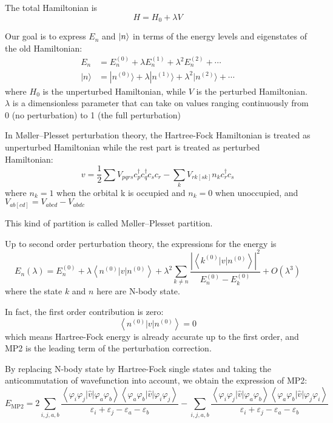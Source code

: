 The total Hamiltonian is
$$
H=H_{0}+\lambda V
$$

Our goal is to express $E_n$ and $\ket{n}$  in terms of the energy levels and eigenstates of the old Hamiltonian:
$$
\begin{aligned}
	E_{n}&=E_{n}^{(0)}+\lambda E_{n}^{(1)}+\lambda^{2} E_{n}^{(2)}+\cdots
	\\
	| n \rangle&=| n^{(0)} \rangle+\lambda | n^{(1)} \rangle+\lambda^{2} | n^{(2)} \rangle+\cdots
\end{aligned}
$$
where $H_0$ is the unperturbed Hamiltonian, while $V$ is the perturbed Hamiltonian.
$\lambda$ is a dimensionless parameter that can take on values ranging continuously from 0 (no perturbation) to 1 (the full perturbation)

In M{\o}ller–Plesset perturbation theory, the Hartree-Fock Hamiltonian is treated as unperturbed Hamiltonian while the rest part is treated as perturbed Hamiltonian:
$$
v=\frac{1}{2} \sum V_{p q r s} c_{p}^{\dagger} c_{q}^{\dagger} c_{s} c_{r}-\sum_{k} V_{r k[s k]} n_{k} c_{r}^{\dagger} c_{s}
$$
where $n_k=1$ when the orbital k is occupied and $n_k=0$ when unoccupied, and $V_{ab[cd]}=V_{abcd}-V_{abdc}$

This kind of partition is called M{\o}ller–Plesset partition.

Up to second order perturbation theory, the expressions for the energy is
$$
E_{n}(\lambda)=E_{n}^{(0)}+\lambda\left\langle n^{(0)}|v| n^{(0)}\right\rangle+\lambda^{2} \sum_{k \neq n} \frac{\left|\left\langle k^{(0)}|v| n^{(0)}\right\rangle\right|^{2}}{E_{n}^{(0)}-E_{k}^{(0)}}+O\left(\lambda^{3}\right)
$$
where the state $k$ and $n$ here are N-body state.

In fact, the first order contribution is zero:
$$
\left\langle n^{(0)}|v| n^{(0)}\right\rangle=0
$$
which means Hartree-Fock energy is already accurate up to the first order, and MP2 is the leading term of the perturbation correction.

By replacing N-body state by Hartree-Fock single states and taking the anticommutation of wavefunction into account, we obtain the expression of MP2:
$$
E_{\mathrm{MP} 2}=2 \sum_{i, j, a, b} \frac{\left\langle\varphi_{i} \varphi_{j}|\hat{v}| \varphi_{a} \varphi_{b}\right\rangle\left\langle\varphi_{a} \varphi_{b}|\hat{v}| \varphi_{i} \varphi_{j}\right\rangle}{\varepsilon_{i}+\varepsilon_{j}-\varepsilon_{a}-\varepsilon_{b}}-\sum_{i, j, a, b} \frac{\left\langle\varphi_{i} \varphi_{j}|\hat{v}| \varphi_{a} \varphi_{b}\right\rangle\left\langle\varphi_{a} \varphi_{b}|\hat{v}| \varphi_{j} \varphi_{i}\right\rangle}{\varepsilon_{i}+\varepsilon_{j}-\varepsilon_{a}-\varepsilon_{b}}
$$

